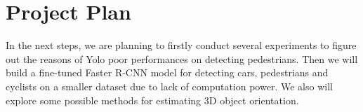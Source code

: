 \section{Project Plan}

In the next steps, we are planning to
firstly conduct several experiments to figure out the reasons of Yolo poor performances on detecting pedestrians. 
Then we will build a fine-tuned Faster R-CNN model for detecting cars, pedestrians and cyclists on a smaller dataset due to lack of computation power. 
We also will explore some possible methods for estimating 3D object orientation.
